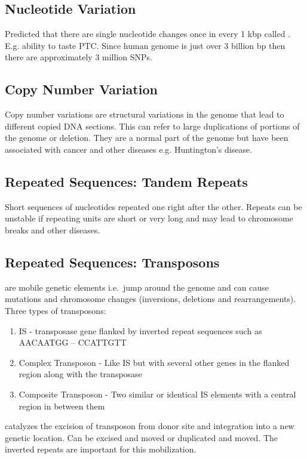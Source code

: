 \documentclass[../Bio_chemistryReview.tex]{subfiles}
\begin{document}
\subsection{Nucleotide Variation}
Predicted that there are single nucleotide changes once in every 1 kbp called
. E.g. ability to taste PTC. Since
human genome is just over 3 billion bp then there are approximately 3 million
SNPs.

\subsection{Copy Number Variation}
Copy number variations are structural variations in the genome that lead to
different copied DNA sections. This can refer to large duplications of portions
of the genome or deletion. They are a normal part of the genome but have been
associated with cancer and other diseases e.g. Huntington's disease.

\subsection{Repeated Sequences: Tandem Repeats}
Short sequences of nucleotides repeated one right after the other. Repeats can
be unstable if repeating units are short or very long and may lead to chromosome
breaks and other diseases.

\subsection{Repeated Sequences: Transposons}
 are mobile genetic elements i.e.\ jump around the genome and
can cause mutations and chromosome changes (inversions, deletions and
rearrangements). Three types of transposons: 
\begin{enumerate}
  \item IS - transposase gene flanked by inverted repeat sequences such as
    AACAATGG  --  CCATTGTT 
  \item Complex Transposon - Like IS but with several other genes in the flanked
    region along with the transposase
  \item Composite Transposon - Two similar or identical IS elements with a
    central region in between them 
\end{enumerate}

 catalyzes the excision of transposon from donor site and
integration into a new genetic location. Can be excised and moved or duplicated
and moved. The inverted repeats are important for this mobilization.
\end{document}
